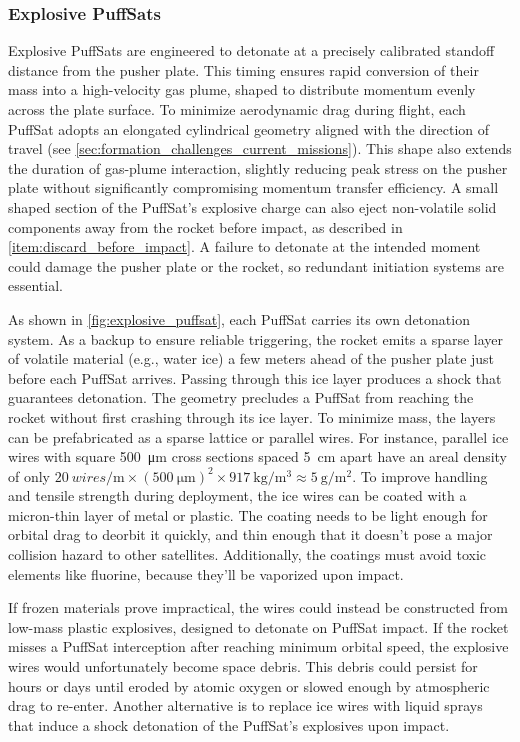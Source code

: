 \documentclass{article}
\begin{document}
\subsubsection{Explosive PuffSats} \label{sec:explosive_puffsat}
Explosive PuffSats are engineered to detonate at a precisely calibrated standoff distance from the pusher plate. This timing ensures rapid conversion of their mass into a high-velocity gas plume, shaped to distribute momentum evenly across the plate surface.  To minimize aerodynamic drag during flight, each PuffSat adopts an elongated cylindrical geometry aligned with the direction of travel (see \autoref{sec:formation_challenges_current_missions}). This shape also extends the duration of gas-plume interaction, slightly reducing peak stress on the pusher plate without significantly compromising momentum transfer efficiency. A small shaped section of the PuffSat's explosive charge can also eject non-volatile solid components away from the rocket before impact, as described in \autoref{item:discard_before_impact}.  A failure to detonate at the intended moment could damage the pusher plate or the rocket, so redundant initiation systems are essential.

As shown in \autoref{fig:explosive_puffsat}, each PuffSat carries its own detonation system. As a backup to ensure reliable triggering, the rocket emits a sparse layer of volatile material (e.g., water ice) a few meters ahead of the pusher plate just before each PuffSat arrives. Passing through this ice layer produces a shock that guarantees detonation. The geometry precludes a  PuffSat from reaching the rocket without first crashing through its ice layer. To minimize mass, the layers can be prefabricated as a sparse lattice or parallel wires. For instance, parallel ice wires with square \SI{500}{\micro\meter} cross sections  spaced \SI{5}{\centi\meter} apart have an areal density of only $\SI{20}{wires\per\meter} \times (\SI{500}{\micro\meter})^2 \times \SI{917}{\kilo\gram\per\cubic\meter} \approx \SI{5}{\gram\per\square\meter}$.  To improve handling and tensile strength during deployment, the ice wires can be coated with a micron-thin layer of metal or plastic. The coating needs to be light enough for orbital drag to deorbit it quickly, and thin enough that it doesn't pose a major collision hazard to other satellites. Additionally, the coatings must avoid toxic elements like fluorine, because they'll be vaporized upon impact.  

If frozen materials prove impractical, the wires could instead be constructed from low-mass plastic explosives, designed to detonate on PuffSat impact.  If the rocket misses a PuffSat interception after reaching  minimum orbital speed, the explosive wires would unfortunately become space debris. This debris could  persist for hours or days until eroded by atomic oxygen or slowed enough by atmospheric drag to re-enter. Another alternative is to replace ice wires with liquid sprays that induce a shock detonation of the PuffSat’s explosives upon impact.
\end{document}
